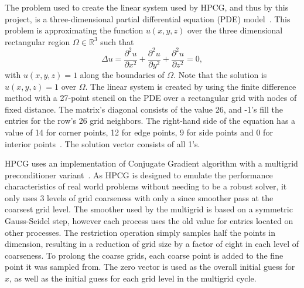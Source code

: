 The problem used to create the linear system used by HPCG, and thus by this project, is a three-dimensional partial differential equation (PDE) model~\cite{Dongarra:2015:HPCG}.
This problem is approximating the function \(u(x, y, z)\) over the three dimensional rectangular region \(\Omega\in\mathbb{R}^3\) such that
\[
	\Delta u = \frac{\partial^2 u}{\partial x^2} + \frac{\partial^2 u}{\partial y^2} + \frac{\partial^2 u}{\partial z^2} = 0,
\] with \(u(x, y, z) = 1\) along the boundaries of \(\Omega\).
Note that the solution is \(u(x, y, z) = 1\) over \(\Omega\).
The linear system is created by using the finite difference method with a 27-point stencil on the PDE over a rectangular grid with nodes of fixed distance.
The matrix's diagonal consists of the value 26, and -1's fill the entries for the row's 26 grid neighbors.
The right-hand side of the equation has a value of 14 for corner points, 12 for edge points, 9 for side points and 0 for interior points~\cite{Kincaid:2009:Numerical}.
The solution vector consists of all 1's.


HPCG uses an implementation of Conjugate Gradient algorithm with a multigrid preconditioner variant~\cite{Dongarra:2015:HPCG}.
As HPCG is designed to emulate the performance characteristics of real world problems without needing to be a robust solver, it only uses 3 levels of grid coarseness with only a since smoother pass at the coarsest grid level.
The smoother used by the multigrid is based on a symmetric Gauss-Seidel step, however each process uses the old value for entries located on other processes.
The restriction operation simply samples half the points in dimension, resulting in a reduction of grid size by a factor of eight in each level of coarseness.
To prolong the coarse grids, each coarse point is added to the fine point it was sampled from.
The zero vector is used as the overall initial guess for \(x\), as well as the initial guess for each grid level in the multigrid cycle.

